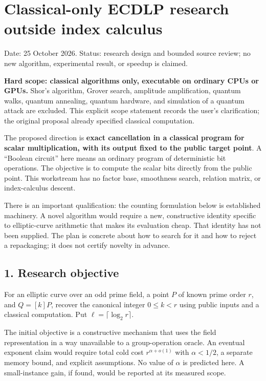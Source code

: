 \documentclass[
  10pt,
]{article}
\author{}
\date{}
\begin{document}
\section{Classical-only ECDLP research outside index
calculus}\label{classical-only-ecdlp-research-outside-index-calculus}

Date: 25 October 2026. Status: research design and bounded source
review; no new algorithm, experimental result, or speedup is claimed.

\textbf{Hard scope: classical algorithms only, executable on ordinary
CPUs or GPUs.} Shor's algorithm, Grover search, amplitude amplification,
quantum walks, quantum annealing, quantum hardware, and simulation of a
quantum attack are excluded. This explicit scope statement records the
user's clarification; the original proposal already specified classical
computation.

The proposed direction is \textbf{exact cancellation in a classical
program for scalar multiplication, with its output fixed to the public
target point}. A ``Boolean circuit'' here means an ordinary program of
deterministic bit operations. The objective is to compute the scalar
bits directly from the public point. This workstream has no factor base,
smoothness search, relation matrix, or index-calculus descent.

There is an important qualification: the counting formulation below is
established machinery. A novel algorithm would require a new,
constructive identity specific to elliptic-curve arithmetic that makes
its evaluation cheap. That identity has not been supplied. The plan is
concrete about how to search for it and how to reject a repackaging; it
does not certify novelty in advance.

\subsection{1. Research objective}\label{research-objective}

For an elliptic curve over an odd prime field, a point \(P\) of known
prime order \(r\), and \(Q=[k]P\), recover the canonical integer
\(0\leq k<r\) using public inputs and a classical computation. Put
\(\ell=\lceil\log_2 r\rceil\).

The initial objective is a constructive mechanism that uses the field
representation in a way unavailable to a group-operation oracle. An
eventual exponent claim would require total cold cost
\(r^{\alpha+o(1)}\) with \(\alpha<1/2\), a separate memory bound, and
explicit assumptions. No value of \(\alpha\) is predicted here. A
small-instance gain, if found, would be reported at its measured scope.
\end{document}
